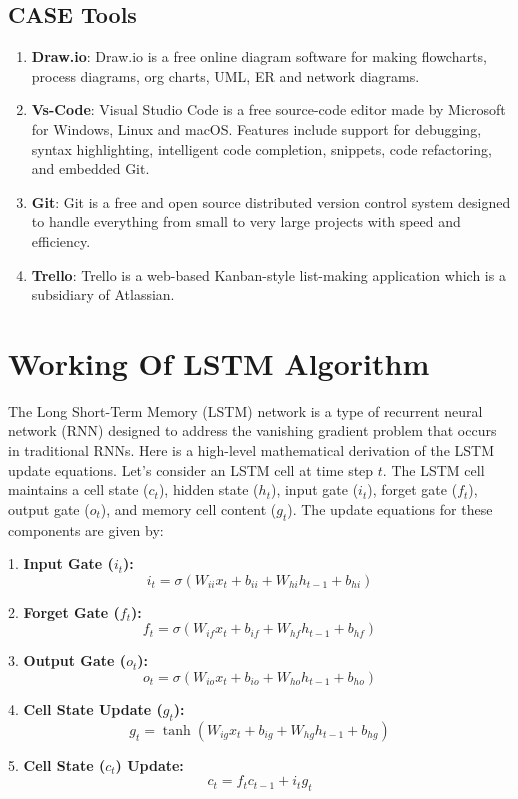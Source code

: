 \documentclass[./main.tex]{subfiles}
\begin{document}
\subsection {CASE Tools}
\begin{enumerate}[label=\ensuremath{\diamond}]
  \item \textbf{Draw.io}: Draw.io is a free online diagram software for making flowcharts, process diagrams, org charts, UML, ER and network diagrams.
  \item \textbf{Vs-Code}: Visual Studio Code is a free source-code editor made by Microsoft for Windows, Linux and macOS. Features include support for debugging, syntax highlighting, intelligent code completion, snippets, code refactoring, and embedded Git.
  \item \textbf{Git}: Git is a free and open source distributed version control system designed to handle everything from small to very large projects with speed and efficiency.
  \item \textbf{Trello}: Trello is a web-based Kanban-style list-making application which is a subsidiary of Atlassian. 
  \end {enumerate}
\section{Working Of LSTM Algorithm}
The Long Short-Term Memory (LSTM) network is a type of recurrent neural network (RNN) designed to address the vanishing gradient problem that occurs in traditional RNNs. Here is a high-level mathematical derivation of the LSTM update equations.
\noindent
Let's consider an LSTM cell at time step \(t\). The LSTM cell maintains a cell state (\(c_t\)), hidden state (\(h_t\)), input gate (\(i_t\)), forget gate (\(f_t\)), output gate (\(o_t\)), and memory cell content (\(g_t\)). The update equations for these components are given by:

1. \textbf{Input Gate (\(i_t\)):}
   \[ i_t = \sigma(W_{ii}x_t + b_{ii} + W_{hi}h_{t-1} + b_{hi}) \]

2. \textbf{Forget Gate (\(f_t\)):}
   \[ f_t = \sigma(W_{if}x_t + b_{if} + W_{hf}h_{t-1} + b_{hf}) \]

3. \textbf{Output Gate (\(o_t\)):}
   \[ o_t = \sigma(W_{io}x_t + b_{io} + W_{ho}h_{t-1} + b_{ho}) \]

4. \textbf{Cell State Update (\(g_t\)):}
   \[ g_t = \tanh(W_{ig}x_t + b_{ig} + W_{hg}h_{t-1} + b_{hg}) \]

5. \textbf{Cell State (\(c_t\)) Update:}
   \[ c_t = f_tc_{t-1} + i_tg_t \]
\end{document}
